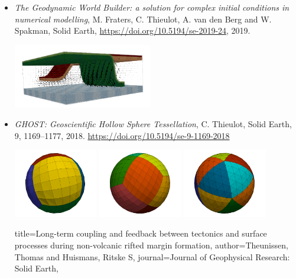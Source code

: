 \begin{itemize}
\item {\it The Geodynamic World Builder: a solution for complex initial conditions in numerical modelling},
M. Fraters, C. Thieulot, A. van den Berg and W. Spakman,
Solid Earth, \url{https://doi.org/10.5194/se-2019-24}, 2019.

\begin{center}
\includegraphics[height=2.8cm]{images/mycodes/frtv19_img}
\end{center}


\end{itemize}


\begin{itemize}
\item {\it GHOST: Geoscientific Hollow Sphere Tessellation}, 
C. Thieulot, Solid Earth, 9, 1169–1177, 2018. \url{https://doi.org/10.5194/se-9-1169-2018}

\begin{center}
\includegraphics[height=3cm]{images/mycodes/shell_HS06}
\includegraphics[height=3cm]{images/mycodes/shell_HS12}
\includegraphics[height=3cm]{images/mycodes/shell_HS20}
\end{center}



title={Long-term coupling and feedback between tectonics and surface processes 
during non-volcanic rifted margin formation},
author={Theunissen, Thomas and Huismans, Ritske S},
journal={Journal of Geophysical Research: Solid Earth},

\end{itemize}

